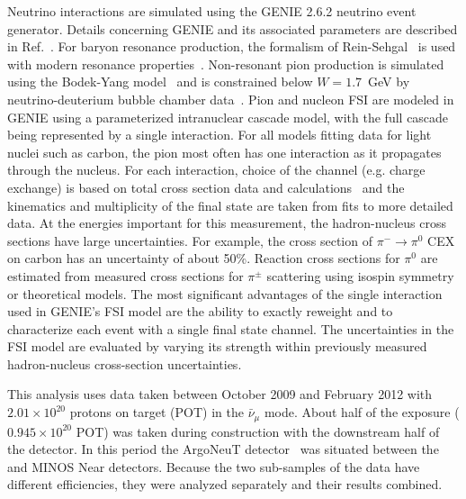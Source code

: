 Neutrino interactions are simulated using the GENIE 2.6.2 neutrino event generator. 
Details concerning GENIE and its associated parameters are described in Ref.~\cite{Andreopoulos201087}.
For baryon resonance production, the formalism of Rein-Sehgal~\cite{Rein:1980wg} is used with modern resonance properties~\cite{pdg}.
Non-resonant pion production is simulated using the Bodek-Yang model~\cite {Bodek:2004pc} and is constrained below $W=1.7$~GeV 
by neutrino-deuterium bubble chamber data~\cite{Radecky:1981fn,Kitagaki:1990vs}.
Pion and nucleon FSI are modeled in GENIE using a parameterized intranuclear cascade model, 
with the full cascade being represented by a single interaction.  For all models fitting data for light nuclei such as carbon, 
the pion most often has one interaction as it propagates through the nucleus.  
For each interaction, choice of the channel (e.g. charge exchange) is based on
total cross section data and calculations~\cite{Lee:2002eq,Ashery:1981tq} and the kinematics and multiplicity of the final state are taken from fits to more detailed data.
At the energies important for this measurement, the hadron-nucleus cross sections have large uncertainties.
For example, the cross section of $\pi^-\rightarrow \pi^0$ CEX on carbon has an uncertainty of about 50\%.
Reaction cross sections for $\pi^0$ are estimated from measured cross sections for $\pi^\pm$ scattering using isospin symmetry or theoretical models.
The most significant advantages of the single interaction used in GENIE's FSI model
are the ability to exactly reweight and to characterize each event with a single final state channel.
The uncertainties in the FSI model are evaluated by varying its strength within previously 
measured hadron-nucleus cross-section uncertainties.

This analysis uses data taken between October 2009 and February 2012 with $2.01\times 10^{20}$ protons on target (POT) in the $\bar{\nu}_\mu$ mode. 
About half of the exposure ($0.945\times 10^{20}$ POT) was taken during construction with the downstream half of the detector.
In this period the ArgoNeuT detector~\cite{Argoneut} was situated between the \minerva and MINOS Near detectors. 
Because the two sub-samples of the data have different efficiencies, they were analyzed separately and their results combined.

